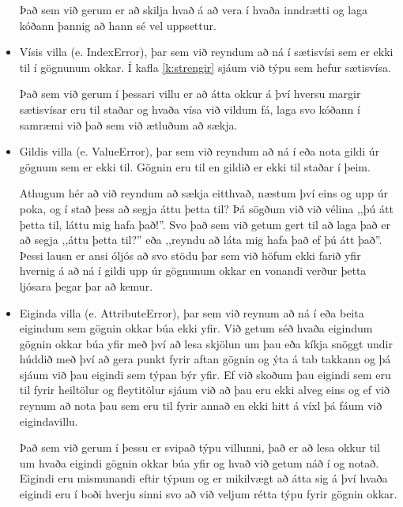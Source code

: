 \begin{itemize}
	Það sem við gerum er að skilja hvað á að vera í hvaða inndrætti og laga kóðann þannig að hann sé vel uppsettur.
	
	\item Vísis villa (e. IndexError), þar sem við reyndum að ná í sætisvísi sem er ekki til í gögnunum okkar.
	Í kafla \ref{k:strengir} sjáum við týpu sem hefur sætisvísa.
	
	Það sem við gerum í þessari villu er að átta okkur á því hversu margir sætisvísar eru til staðar og hvaða vísa við vildum fá, laga svo kóðann í samræmi við það sem við ætluðum að sækja.
	
	\item Gildis villa (e. ValueError), þar sem við reyndum að ná í eða nota gildi úr gögnum sem er ekki til.
	Gögnin eru til en gildið er ekki til staðar í þeim.
	
	Athugum hér að við reyndum að sækja eitthvað, næstum því eins og upp úr poka, og í stað þess að segja áttu þetta til? Þá sögðum við við vélina ,,þú átt þetta til, láttu mig hafa það!''. Svo það sem við getum gert til að laga það er að segja ,,áttu þetta til?'' eða ,,reyndu að láta mig hafa það ef þú átt það''. 
	Þessi lausn er ansi óljós að svo stödu þar sem við höfum ekki farið yfir hvernig á að ná í gildi upp úr gögnunum okkar en vonandi verður þetta ljósara þegar þar að kemur.
	
	\item Eiginda villa (e. AttributeError), þar sem við reynum að ná í eða beita eigindum sem gögnin okkar búa ekki yfir.
	Við getum séð hvaða eigindum gögnin okkar búa yfir með því að lesa skjölun um þau eða kíkja snöggt undir húddið með því að gera punkt fyrir aftan gögnin og ýta á tab takkann  og þá sjáum við þau eigindi sem týpan býr yfir.
	Ef við skoðum þau eigindi sem eru til fyrir heiltölur og fleytitölur sjáum við að þau eru ekki alveg eins og ef við reynum að nota þau sem eru til fyrir annað en ekki hitt á víxl þá fáum við eigindavillu.
	
	Það sem við gerum í þessu er svipað týpu villunni, það er að lesa okkur til um hvaða eigindi gögnin okkar búa yfir og hvað við getum náð í og notað.
	Eigindi eru mismunandi eftir týpum og er mikilvægt að átta sig á því hvaða eigindi eru í boði hverju sinni svo að við veljum rétta týpu fyrir gögnin okkar.
\end{itemize}